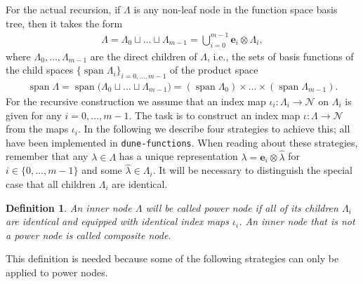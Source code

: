 \documentclass[a4paper,10pt,headings=normal,bibliography=totoc]{scrartcl}
\newtheorem{definition}{Definition}
\newcommand{\dunemodule}[1]{\texttt{#1}}
\begin{document}
For the actual recursion,
if $\Lambda$ is any non-leaf node in the function space basis tree,
then it takes the form
\begin{align*}
  \Lambda = \Lambda_0 \sqcup \dots \sqcup \Lambda_{m-1}
          = \bigcup_{i=0}^{m-1} \mathbf{e}_i \otimes \Lambda_i,
\end{align*}
where $\Lambda_0, \dots,\Lambda_{m-1}$ are the direct children of $\Lambda$,
i.e., the sets of basis functions of the child
spaces $\{\operatorname{span} \Lambda_i\}_{i=0,\dots,m-1}$ of the product space
\begin{align*}
  \operatorname{span} \Lambda
    = \operatorname{span} \bigl( \Lambda_0 \sqcup \dots \sqcup \Lambda_{m-1} \bigr)
    = (\operatorname{span} \Lambda_0) \times \dots \times (\operatorname{span} \Lambda_{m-1}).
\end{align*}
For the recursive construction we assume that an index map
$\iota_i : \Lambda_i \to \mathcal{N}$ on $\Lambda_i$ is given for any $i=0,\dots,m-1$.
The task is to construct an index map $\iota: \Lambda \to \mathcal{N}$
from the maps $\iota_i$.
In the following we describe four strategies to achieve this; all
have been implemented in \dunemodule{dune-functions}. When reading about these
strategies, remember that any $\lambda \in \Lambda$ has a unique representation
$\lambda = \mathbf{e}_i \otimes \hat{\lambda}$ for $i \in \{0,\dots,m-1\}$ and some
$\hat{\lambda} \in \Lambda_i$.
It will be necessary to distinguish the special case that all children
$\Lambda_i$ are identical.
%
\begin{definition}
\label{def:power_node}
  An inner node $\Lambda$ will be called \emph{power node} if all of its children $\Lambda_i$
  are identical and equipped with identical index maps $\iota_i$.
  An inner node that is not a power node is called \emph{composite node}.
\end{definition}
%
This definition is needed because some of the following strategies can only be applied
to power nodes.
\end{document}
